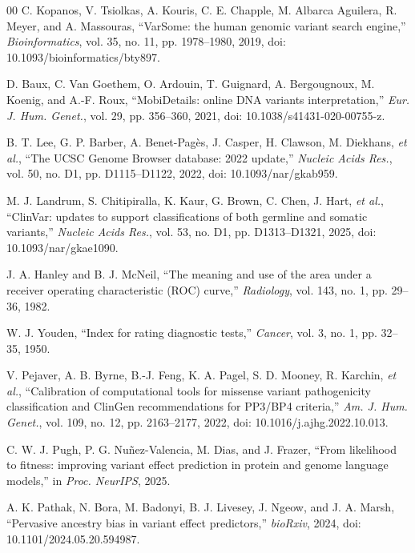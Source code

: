\documentclass[conference,a4paper]{IEEEtran}
\begin{document}
\begin{thebibliography}{00}
 C. Kopanos, V. Tsiolkas, A. Kouris, C. E. Chapple, M. Albarca Aguilera, R. Meyer, and A. Massouras, ``VarSome: the human genomic variant search engine,'' \textit{Bioinformatics}, vol. 35, no. 11, pp. 1978--1980, 2019, doi: 10.1093/bioinformatics/bty897.

 D. Baux, C. Van Goethem, O. Ardouin, T. Guignard, A. Bergougnoux, M. Koenig, and A.-F. Roux, ``MobiDetails: online DNA variants interpretation,'' \textit{Eur. J. Hum. Genet.}, vol. 29, pp. 356--360, 2021, doi: 10.1038/s41431-020-00755-z.

 B. T. Lee, G. P. Barber, A. Benet-Pag\`es, J. Casper, H. Clawson, M. Diekhans, \emph{et al.}, ``The UCSC Genome Browser database: 2022 update,'' \textit{Nucleic Acids Res.}, vol. 50, no. D1, pp. D1115--D1122, 2022, doi: 10.1093/nar/gkab959.

 M. J. Landrum, S. Chitipiralla, K. Kaur, G. Brown, C. Chen, J. Hart, \emph{et al.}, ``ClinVar: updates to support classifications of both germline and somatic variants,'' \textit{Nucleic Acids Res.}, vol. 53, no. D1, pp. D1313--D1321, 2025, doi: 10.1093/nar/gkae1090.

 J. A. Hanley and B. J. McNeil, ``The meaning and use of the area under a receiver operating characteristic (ROC) curve,'' \textit{Radiology}, vol. 143, no. 1, pp. 29--36, 1982.

 W. J. Youden, ``Index for rating diagnostic tests,'' \textit{Cancer}, vol. 3, no. 1, pp. 32--35, 1950.

 V. Pejaver, A. B. Byrne, B.-J. Feng, K. A. Pagel, S. D. Mooney, R. Karchin, \emph{et al.}, ``Calibration of computational tools for missense variant pathogenicity classification and ClinGen recommendations for PP3/BP4 criteria,'' \textit{Am. J. Hum. Genet.}, vol. 109, no. 12, pp. 2163--2177, 2022, doi: 10.1016/j.ajhg.2022.10.013.

 C. W. J. Pugh, P. G. Nu\~nez-Valencia, M. Dias, and J. Frazer, ``From likelihood to fitness: improving variant effect prediction in protein and genome language models,'' in \textit{Proc. NeurIPS}, 2025.

 A. K. Pathak, N. Bora, M. Badonyi, B. J. Livesey, J. Ngeow, and J. A. Marsh, ``Pervasive ancestry bias in variant effect predictors,'' \textit{bioRxiv}, 2024, doi: 10.1101/2024.05.20.594987.

\end{thebibliography}
\end{document}
